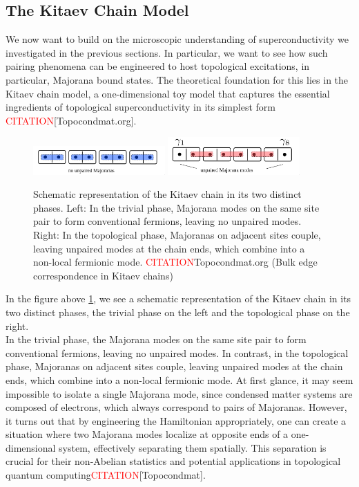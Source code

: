 \documentclass[11pt, letterpaper, titlepage]{article}
\begin{document}
\subsection{The Kitaev Chain Model}
We now want to build on the microscopic understanding of superconductivity we investigated in the previous sections. In particular, we want to see how such pairing phenomena can be engineered to host topological excitations, in particular, Majorana bound states. The theoretical foundation for this lies in the Kitaev chain model, a one-dimensional toy model that captures the essential ingredients of topological superconductivity in its simplest form \textcolor{red}{CITATION}[Topocondmat.org].\\
\begin{figure}
  \centering
  \includegraphics[width=0.45\textwidth]{../External_Figs/no_unpaired.png}
  \includegraphics[width=0.45\textwidth]{../External_Figs/unpaired.png}
  \caption{Schematic representation of the Kitaev chain in its two distinct phases. Left: In the trivial phase, Majorana modes on the same site pair to form conventional fermions, leaving no unpaired modes. Right: In the topological phase, Majoranas on adjacent sites couple, leaving unpaired modes at the chain ends, which combine into a non-local fermionic mode. \textcolor{red}{CITATION}Topocondmat.org (Bulk edge correspondence in Kitaev chains)}
  \label{fig:kitaev}
\end{figure}
In the figure above \ref{fig:kitaev}, we see a schematic representation of the Kitaev chain in its two distinct phases, the trivial phase on the left and the topological phase on the right.\\
In the trivial phase, the Majorana modes on the same site pair to form conventional fermions, leaving no unpaired modes. In contrast, in the topological phase, Majoranas on adjacent sites couple, leaving unpaired modes at the chain ends, which combine into a non-local fermionic mode. At first glance, it may seem impossible to isolate a single Majorana mode, since condensed matter systems are composed of electrons, which always correspond to pairs of Majoranas. However, it turns out that by engineering the Hamiltonian appropriately, one can create a situation where two Majorana modes localize at opposite ends of a one-dimensional system, effectively separating them spatially. This separation is crucial for their non-Abelian statistics and potential applications in topological quantum computing\textcolor{red}{CITATION}[Topocondmat].\\
\end{document}
